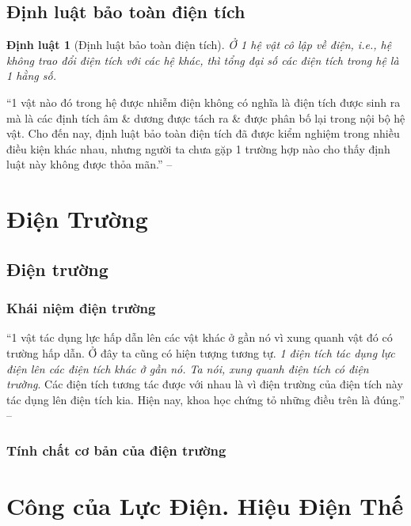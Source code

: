 \documentclass[oneside]{book}
\numberwithin{equation}{section}
\newtheorem{dinhluat}{Định luật}[section]
\begin{document}
\subsection{Định luật bảo toàn điện tích}

\begin{dinhluat}[Định luật bảo toàn điện tích]
	Ở 1 hệ vật cô lập về điện, i.e., hệ không trao đổi điện tích với các hệ khác, thì tổng đại số các điện tích trong hệ là 1 hằng số.
\end{dinhluat}
``1 vật nào đó trong hệ được nhiễm điện không có nghĩa là điện tích được sinh ra mà là các định tích âm \& dương được tách ra \& được phân bố lại trong nội bộ hệ vật. Cho đến nay, định luật bảo toàn điện tích đã được kiểm nghiệm trong nhiều điều kiện khác nhau, nhưng người ta chưa gặp 1 trường hợp nào cho thấy định luật này không được thỏa mãn.'' -- \cite[p. 12]{SGK_Vat_Ly_11_nang_cao}


\section{Điện Trường}

\subsection{Điện trường}

\subsubsection{Khái niệm điện trường}
``1 vật tác dụng lực hấp dẫn lên các vật khác ở gần nó vì xung quanh vật đó có trường hấp dẫn. Ở đây ta cũng có hiện tượng tương tự. \textit{1 điện tích tác dụng lực điện lên các điện tích khác ở gần nó. Ta nói, xung quanh điện tích có điện trường}. Các điện tích tương tác được với nhau là vì điện trường của điện tích này tác dụng lên điện tích kia. Hiện nay, khoa học chứng tỏ những điều trên là đúng.'' -- \cite[p. 13]{SGK_Vat_Ly_11_nang_cao}

\subsubsection{Tính chất cơ bản của điện trường}


\section{Công của Lực Điện. Hiệu Điện Thế}
\end{document}
